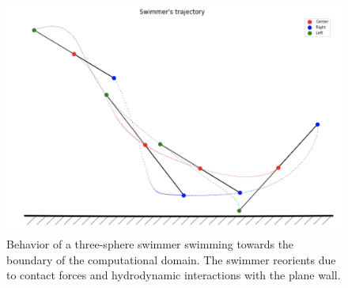 \documentclass[graybox]{svmult}
\begin{document}
\begin{figure}[h!]
    \centering
    \centerline{\includegraphics[scale=0.5]{img-three-sphere-sw_motion2_tmp.png}}
    \caption{Behavior of a three-sphere swimmer swimming towards the boundary of 
	the computational domain. The swimmer reorients due to contact forces and hydrodynamic interactions with the plane wall.}
    \label{fig:3ss}
\end{figure}
\end{document}
